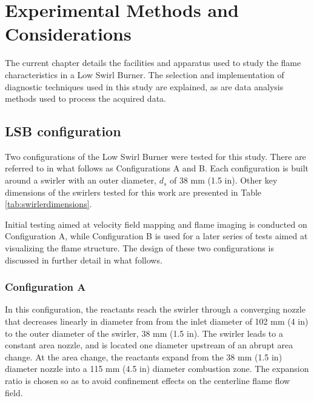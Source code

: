 \chapter{Experimental Methods and Considerations}


The current chapter details the facilities and apparatus used to study the flame characteristics in a Low Swirl Burner.
The selection and implementation of diagnostic techniques used in this study are explained, as are data analysis methods used to process the acquired data.

\section{LSB configuration}

Two configurations of the Low Swirl Burner were tested for this study.
There are referred to in what follows as Configurations A and B.
Each configuration is built around a swirler with an outer diameter, \(d_s\) of 38 mm (1.5 in).
Other key dimensions of the swirlers tested for this work are presented in Table \ref{tab:swirlerdimensions}.



Initial testing aimed at velocity field mapping and flame imaging is conducted on Configuration A, while Configuration B is used for a later series of tests aimed at visualizing the flame structure.
The design of these two configurations is discussed in further detail in what follows.

\subsection{Configuration A}

In this configuration, the reactants reach the swirler through a converging nozzle that decreases linearly in diameter from from the inlet diameter of 102 mm (4 in) to the outer diameter of the swirler, 38 mm (1.5 in).
The swirler leads to a constant area nozzle, and is located one diameter upstream of an abrupt area change.
At the area change, the reactants expand from the 38 mm (1.5 in) diameter nozzle into a 115 mm (4.5 in) diameter combustion zone.
The expansion ratio is chosen so as to avoid confinement effects on the centerline flame flow field.\cite{1998-yegian}

